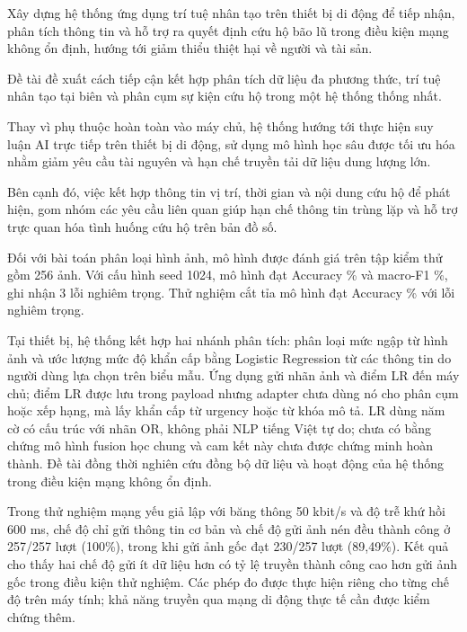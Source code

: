
Xây dựng hệ thống ứng dụng trí tuệ nhân tạo trên thiết bị di động để tiếp nhận, phân tích thông tin và hỗ trợ ra quyết định cứu hộ bão lũ trong điều kiện mạng không ổn định, hướng tới giảm thiểu thiệt hại về người và tài sản.

Đề tài đề xuất cách tiếp cận kết hợp phân tích dữ liệu đa phương thức, trí tuệ nhân tạo tại biên và phân cụm sự kiện cứu hộ trong một hệ thống thống nhất.

Thay vì phụ thuộc hoàn toàn vào máy chủ, hệ thống hướng tới thực hiện suy luận AI trực tiếp trên thiết bị di động, sử dụng mô hình học sâu được tối ưu hóa nhằm giảm yêu cầu tài nguyên và hạn chế truyền tải dữ liệu dung lượng lớn.

Bên cạnh đó, việc kết hợp thông tin vị trí, thời gian và nội dung cứu hộ để phát hiện, gom nhóm các yêu cầu liên quan giúp hạn chế thông tin trùng lặp và hỗ trợ trực quan hóa tình huống cứu hộ trên bản đồ số.

Đối với bài toán phân loại hình ảnh, mô hình được đánh giá trên tập kiểm thử gồm 256 ảnh. Với cấu hình seed 1024, mô hình đạt Accuracy \NewImageAccuracy\% và macro-F1 \NewImageMacroFOne\%, ghi nhận 3 lỗi nghiêm trọng. Thử nghiệm cắt tỉa mô hình đạt Accuracy \PruningAccuracy\% với \PruningCriticalCount{} lỗi nghiêm trọng.

Tại thiết bị, hệ thống kết hợp hai nhánh phân tích: phân loại mức ngập từ hình ảnh và ước lượng mức độ khẩn cấp bằng Logistic Regression từ các thông tin do người dùng lựa chọn trên biểu mẫu. Ứng dụng gửi nhãn ảnh và điểm LR đến máy chủ; điểm LR được lưu trong payload nhưng adapter chưa dùng nó cho phân cụm hoặc xếp hạng, mà lấy khẩn cấp từ urgency hoặc từ khóa mô tả. LR dùng năm cờ có cấu trúc với nhãn OR, không phải NLP tiếng Việt tự do; chưa có bằng chứng mô hình fusion học chung và cam kết này chưa được chứng minh hoàn thành. Đề tài đồng thời nghiên cứu đồng bộ dữ liệu và hoạt động của hệ thống trong điều kiện mạng không ổn định.

Trong thử nghiệm mạng yếu giả lập với băng thông 50 kbit/s và độ trễ khứ hồi 600 ms, chế độ chỉ gửi thông tin cơ bản và chế độ gửi ảnh nén đều thành công ở 257/257 lượt (100\%), trong khi gửi ảnh gốc đạt 230/257 lượt (89,49\%). Kết quả cho thấy hai chế độ gửi ít dữ liệu hơn có tỷ lệ truyền thành công cao hơn gửi ảnh gốc trong điều kiện thử nghiệm. Các phép đo được thực hiện riêng cho từng chế độ trên máy tính; khả năng truyền qua mạng di động thực tế cần được kiểm chứng thêm.

